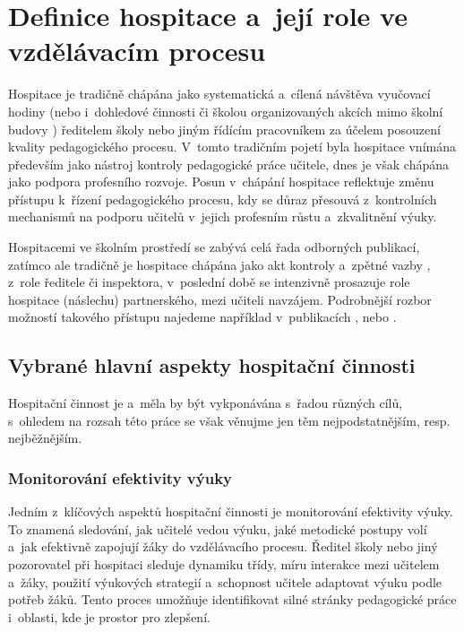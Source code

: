 \setcounter{page}{1}

\section{Definice hospitace a~její role ve vzdělávacím procesu}

Hospitace je tradičně chápána jako systematická a~cílená návštěva vyučovací hodiny (nebo i~dohledové činnosti či školou organizovaných akcích mimo školní budovy \cite{hospitace-funkce}) ředitelem školy nebo jiným řídícím pracovníkem za účelem posouzení kvality pedagogického procesu. V~tomto tradičním pojetí byla hospitace vnímána především jako nástroj kontroly pedagogické práce učitele, dnes je však chápána jako podpora profesního rozvoje. Posun v~chápání hospitace reflektuje změnu přístupu k~řízení pedagogického procesu, kdy se důraz přesouvá z~kontrolních mechanismů na podporu učitelů v~jejich profesním růstu a~zkvalitnění výuky.\cite{ped-proces-rizeni}

Hospitacemi ve školním prostředí se zabývá celá řada odborných publikací, zatímco ale tradičně je hospitace chápána jako akt kontroly a~zpětné vazby , z~role ředitele či inspektora, v~poslední době se intenzivně prosazuje  role hospitace (náslechu) partnerského, mezi učiteli navzájem. Podrobnější rozbor možností takového přístupu najedeme například v~publikacích \cite{ucime-ucit-se}, \cite{metody-a-formy} nebo \cite{rozvijejici-hospotace}. 

\subsection{Vybrané hlavní aspekty hospitační činnosti}

Hospitační činnost je a~měla by být vykponávána s~řadou různých cílů, s~ohledem na rozsah této práce se však věnujme jen těm nejpodstatnějším, resp. nejběžnějším.

\subsubsection{Monitorování efektivity výuky}

Jedním z~klíčových aspektů hospitační činnosti je monitorování efektivity výuky. To znamená sledování, jak učitelé vedou výuku, jaké metodické postupy volí a~jak efektivně zapojují žáky do vzdělávacího procesu. Ředitel školy nebo jiný pozorovatel při hospitaci sleduje dynamiku třídy, míru interakce mezi učitelem a~žáky, použití výukových strategií a~schopnost učitele adaptovat výuku podle potřeb žáků. Tento proces umožňuje identifikovat silné stránky pedagogické práce i~oblasti, kde je prostor pro zlepšení.

